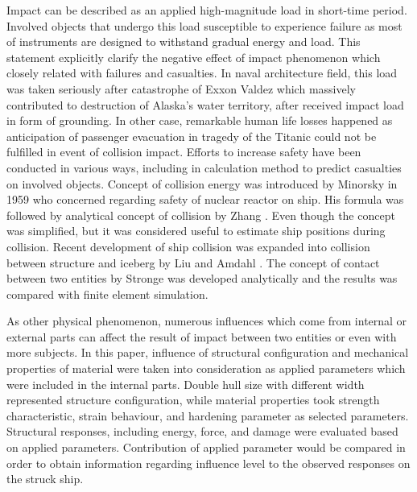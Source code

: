 \documentclass[../Final.tex]{subfiles}
\begin{document}
Impact can be described as an applied high-magnitude load in short-time period. Involved objects that undergo this load susceptible to experience failure as most of instruments are 
designed to withstand gradual energy and load. This statement explicitly clarify the negative effect of impact phenomenon which closely related with failures and casualties. 
In naval architecture field, this load was taken seriously after catastrophe of Exxon Valdez which massively contributed to destruction of Alaska's water territory, after received impact load in form of grounding. 
In other case, remarkable human life losses happened as anticipation of pas­senger evacuation in tragedy of the Titanic could not be fulfilled in event of collision impact. 
Efforts to increase safety have been conducted in various ways, including in calculation method to predict casualties on involved objects. Concept of collision energy was introduced by Minorsky \cite{minorsky1958analysis} 
in 1959 who concerned regarding safety of nuclear reactor on ship. His for­mula was followed by analytical concept of collision by Zhang \cite{zhang1999mechanics}. 
Even though the concept was simplified, but it was considered useful to estimate ship positions during collision. Recent development of ship collision was expanded into collision between structure and iceberg by Liu and Amdahl \cite{liu2010new}. 
The concept of contact between two entities by Stronge \cite{coaplen2004work} was developed analytically and the results was compared with finite element simulation. 

As other physical phenomenon, numerous influences which come from internal or external parts can affect the result of impact between two entities or even with more subjects. 
In this paper, influence of structural configuration and mechanical properties of material were taken into consideration as applied parameters which were included in the internal parts. 
Double hull size with different width represented structure configuration, while material properties took strength characteristic, strain behaviour, and hardening parameter as selected parameters. 
Structural responses, including energy, force, and damage were evaluated based on applied parameters. 
Contribution of applied parameter would be compared in order to obtain information regarding influence level to the observed responses on the struck ship. 
\end{document}
